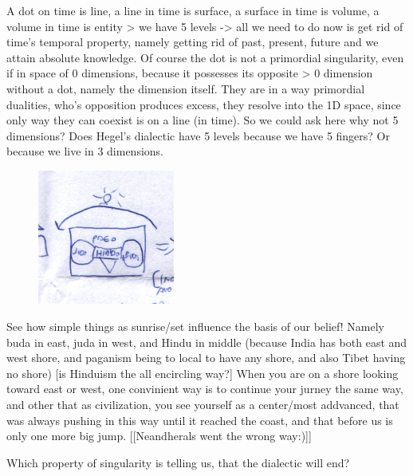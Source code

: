 \documentclass[10pt]{book}
\begin{document}
A dot on time is line, a line in time is surface, a surface in time is volume, a volume in time is entity > we have 5 levels -> all we need to do now is get rid of time's temporal property, namely getting rid of past, present, future and we attain absolute knowledge.
Of course the dot is not a primordial singularity, even if in space of 0 dimensions, because it possesses its opposite > 0 dimension without a dot, namely the dimension itself. They are in a way primordial dualities, who's opposition produces excess, they resolve into the 1D space, since only way they can coexist is on a line (in time).
So we could ask here why not 5 dimensions? Does Hegel's dialectic have 5 levels because we have 5 fingers? Or because we live in 3 dimensions.
\begin{figure}[ht!]
\centering
\includegraphics[width=45mm]{scan01.jpg}
\label{overflow}
\end{figure}
See how simple things as sunrise/set influence the basis of our belief! Namely buda in east, juda in west, and Hindu in middle (because India has both east and west shore, and paganism being to local to have any shore, and also Tibet having no shore) [is Hinduism the all encircling way?] When you are on a shore looking toward east or west, one convinient way is to continue your jurney the same way, and other that as civilization, you see yourself as a center/most addvanced, that was always pushing in this way until it reached the coast, and that before us is only one more big jump. [[Neandherals went the wrong way:)]]

Which property of singularity is telling us, that the dialectic will end?
\end{document}
